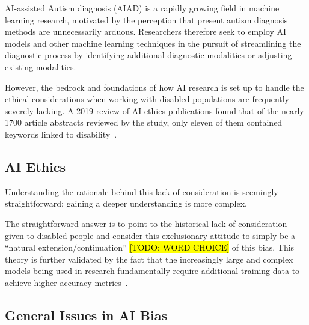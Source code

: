 \documentclass[letterpaper]{article}
\begin{document}
AI-assisted Autism diagnosis (AIAD) is a rapidly growing field in machine learning research, motivated by the perception that present autism diagnosis methods are unnecessarily arduous. Researchers therefore seek to employ AI models and other machine learning techniques in the pursuit of streamlining the diagnostic process by identifying additional diagnostic modalities or adjusting existing modalities.

However, the bedrock and foundations of how AI research is set up to handle the ethical considerations when working with disabled populations are frequently severely lacking. A 2019 review of AI ethics publications found that of the nearly 1700 article abstracts reviewed by the study, only eleven of them contained keywords linked to disability~\cite{ethics}. 

\subsection{AI Ethics}
Understanding the rationale behind this lack of consideration is seemingly straightforward; gaining a deeper understanding is more complex.

The straightforward answer is to point to the historical lack of consideration given to disabled people and consider this exclusionary attitude to simply be a ``natural extension/continuation'' \hl{[TODO: WORD CHOICE]} of this bias. This theory is further validated by the fact that the increasingly large and complex models being used in research fundamentally require additional training data to achieve higher accuracy metrics~\cite[p.~613]{stopar}.

\subsection{General Issues in AI Bias}
\end{document}
